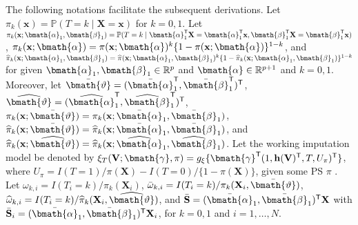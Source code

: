 \documentclass[useAMS,referee,usenatbib]{biom}
\def\bx{\mathbf{x}}
\def\bX{\mathbf{X}}
\def\bV{\mathbf{V}}
\def\bh{\mathbf{h}}
\def\bSbar{\bar{\mathbf{S}}}
\def\bgam{\bmath{\gamma}}
\def\balph{\bmath{\alpha}}
\def\balphhat{\widehat{\bmath{\alpha}}}
\def\balphbar{\bar{\bmath{\alpha}}}
\def\bbeta{\bmath{\beta}}
\def\bbetahat{\widehat{\bmath{\beta}}}
\def\bbetabar{\bar{\bmath{\beta}}}
\def\pihat{\widehat{\pi}}
\def\trans{^{\sf \tiny T}}
\def\bvthetbar{\bar{\bmath{\vartheta}}}
\def\bvthethat{\widehat{\bmath{\vartheta}}}
\def\P{\mathbb{P}}
\def\omegahat{\widehat{\omega}}
\def\omegabar{\bar{\omega}}
\begin{document}
The following notations facilitate the subsequent derivations.  Let $\pi_k(\bx)=\P(T=k\mid \bX=\bx)$ for $k=0,1$.  Let $\pi_k(\bx;\balph_1,\bbeta_1)=\P(T=k\mid\balph_1\trans\bX=\balph_1\trans\bx,\bbeta_1\trans\bX=\bbeta_1\trans\bx)$, $\pi_k(\bx;\balph)=\pi(\bx;\balph)^k\{ 1-\pi(\bx;\balph)\}^{1-k}$, and $\pihat_k(\bx;\balph_1,\bbeta_1)=\pihat(\bx;\balph_1,\bbeta_1)^k\{1-\pihat_k(\bx;\balph_1,\bbeta_1)\}^{1-k}$ for given $\balph_1,\bbeta_1\in\mathbb{R}^p$ and $\balph\in\mathbb{R}^{p+1}$ and $k=0,1$. Moreover, let $\bvthetbar = (\balphbar_1\trans,\bbetabar_1\trans)\trans$, $\bvthethat = (\balphhat_1\trans,\bbetahat_1\trans)\trans$, $\pi_k(\bx;\bvthetbar)=\pi_k(\bx;\balphbar_1,\bbetabar_1)$, $\pihat_k(\bx;\bvthetbar)= \pihat_k(\bx;\balphbar_1,\bbetabar_1)$, and $\pihat_k(\bx;\bvthethat)=\pihat_k(\bx;\balphhat_1,\bbetahat_1)$. Let the working imputation model be denoted by $\xi_T(\bV;\bgam,\pi)=g_{\xi}\{\bgam\trans(1,\bh(\bV)\trans,T,U_{\pi})\trans\}$, where $U_{\pi}= I(T=1)/\pi(\bX) - I(T=0)/\{ 1-\pi(\bX)\}$, given some PS $\pi$ .  Let $\omega_{k,i} = I(T_i = k)/\pi_k(\bX_i)$, $\omegabar_{k,i} = I(T_i=k)/\pi_k(\bX_i,\bvthetbar)$, $\omegahat_{k,i} = I(T_i = k)/\pihat_k(\bX_i,\bvthethat)$, and $\bSbar = (\balphbar_1,\bbetabar_1)\trans\bX$ with $\bSbar_i = (\balphbar_1,\bbetabar_1)\trans\bX_i$, for $k=0,1$ and $i=1,\ldots,N$. 
\end{document}
